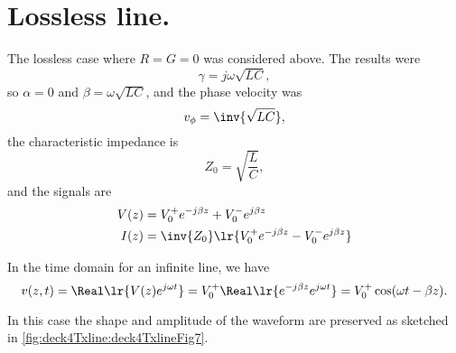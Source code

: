 \section{Lossless line.}
The lossless case where \( R = G = 0 \) was considered above.  The results were
\begin{dmath}\label{eqn:uwaves4TransmissionLines:540}
\gamma = j \omega \sqrt{ L C },
\end{dmath}
so \( \alpha = 0 \) and \( \beta = \omega \sqrt{LC} \), and the phase velocity was
\begin{dmath}\label{eqn:uwaves4TransmissionLines:560}
v_\phi = \inv{\sqrt{LC}},
\end{dmath}
the characteristic impedance is
\begin{dmath}\label{eqn:uwaves4TransmissionLines:580}
Z_0 = \sqrt{\frac{L}{C}},
\end{dmath}
and the signals are
\begin{equation}\label{eqn:uwaves4TransmissionLines:600}
\begin{aligned}
V(z) &= V_0^{+} e^{-j \beta z} + V_0^{-} e^{j \beta z} \\
I(z) &= \inv{Z_0} \lr{ V_0^{+} e^{-j \beta z} - V_0^{-} e^{j \beta z} }
\end{aligned}
\end{equation}

In the time domain for an infinite line, we have
\begin{dmath}\label{eqn:uwaves4TransmissionLines:620}
v(z, t)
= \Real\lr{ V(z) e^{j \omega t} }
= V_0^{+} \Real\lr{ e^{-j \beta z} e^{j \omega t} }
= V_0^{+} \cos( \omega t - \beta z ).
\end{dmath}

In this case the shape and amplitude of the waveform are preserved as sketched in \cref{fig:deck4Txline:deck4TxlineFig7}.
